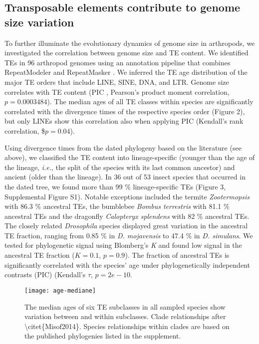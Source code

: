 \subsection{Transposable elements contribute to genome size
variation}\label{transposable-elements-contribute-to-genome-size-variation}

To further illuminate the evolutionary dynamics of genome size in
arthropods, we investigated the correlation between genome size and TE
content. We identified TEs in 96 arthropod genomes using an annotation
pipeline that combines RepeatModeler \citep{Smit2015} and RepeatMasker
\citep{Smit2015a}. We inferred the TE age distribution of the major TE
orders that include LINE, SINE, DNA, and LTR. Genome size correlates
with TE content (PIC \citep{Felsenstein1985}, Pearson's product moment
correlation, \(p = 0.0003484\)). The median ages of all TE classes
within species are significantly correlated with the divergence times of
the respective species order (Figure 2), but only LINEs show this
correlation also when applying PIC (Kendall's rank correlation,
\$\(p = 0.04\)).

Using divergence times from the dated phylogeny based on the literature
(see above), we classified the TE content into lineage-specific (younger
than the age of the lineage, \emph{i.e.}, the split of the species with
its last common ancestor) and ancient (older than the lineage). In 36
out of 53 insect species that occurred in the dated tree, we found more
than 99 \% lineage-specific TEs (Figure 3, Supplemental Figure S1).
Notable exceptions included the termite \emph{Zootermopsis} with 86.3 \%
ancestral TEs, the bumblebee \emph{Bombus terrestris} with 81.1 \%
ancestral TEs and the dragonfly \emph{Calopteryx splendens} with 82 \%
ancestral TEs. The closely related \emph{Drosophila} species displayed
great variation in the ancestral TE fraction, ranging from 0.85 \% in
\emph{D. mojavensis} to 47.4 \% in \emph{D. simulans}. We tested for
phylogenetic signal using Blomberg's \emph{K} and found low signal in
the ancestral TE fraction (\(K = 0.1\), \(p = 0.9\)). The
fraction of ancestral TEs is significantly correlated with the species'
age under phylogenetically independent contrasts (PIC) (Kendall's
\(\tau\), \(p = 2e-10\).

\begin{figure}[h!]
\begin{center}
\texttt{[image: age-mediane]}
\caption[Median ages of TE subclasses in arthropod genomes]{{The median ages of six TE subclasses in all sampled species show
variation between and within subclasses. Clade relationships after
\textbackslash{}citet\{Misof2014\}. Species relationships within clades
are based on the published phylogenies listed in the supplement.
{\label{301428}}%
}}
\end{center}
\end{figure}

